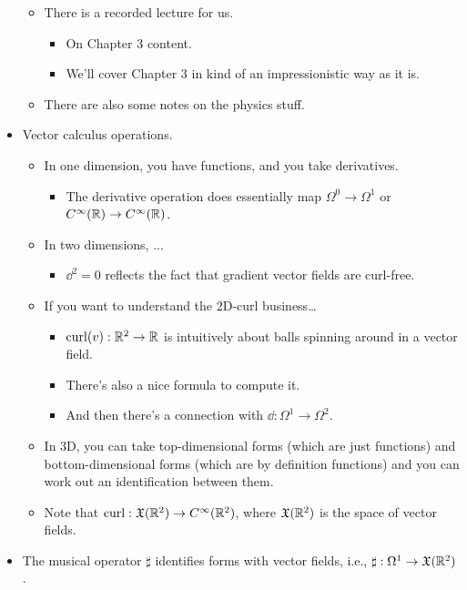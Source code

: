 \documentclass[../notes.tex]{subfiles}
\begin{document}
\begin{itemize}
\begin{itemize}
\begin{itemize}
        \end{itemize}
        \item There is a recorded lecture for us.
        \begin{itemize}
            \item On Chapter 3 content.
            \item We'll cover Chapter 3 in kind of an impressionistic way as it is.
        \end{itemize}
        \item There are also some notes on the physics stuff.
    \end{itemize}
    \item Vector calculus operations.
    \begin{itemize}
        \item In one dimension, you have functions, and you take derivatives.
        \begin{itemize}
            \item The derivative operation does essentially map $\Omega^0\to\Omega^1$ or $C^\infty(\mathbb{R})\to C^\infty(\mathbb{R})$.
        \end{itemize}
        \item In two dimensions, ...
        \begin{itemize}
            \item $\dd^2=0$ reflects the fact that gradient vector fields are curl-free.
        \end{itemize}
        \item If you want to understand the 2D-curl business\dots
        \begin{itemize}
            \item $\operatorname{curl}(v):\mathbb{R}^2\to\mathbb{R}$ is intuitively about balls spinning around in a vector field.
            \item There's also a nice formula to compute it.
            \item And then there's a connection with $\dd:\Omega^1\to\Omega^2$.
        \end{itemize}
        \item In 3D, you can take top-dimensional forms (which are just functions) and bottom-dimensional forms (which are by definition functions) and you can work out an identification between them.
        \item Note that $\operatorname{curl}:\mathfrak{X}(\mathbb{R}^2)\to C^\infty(\mathbb{R}^2)$, where $\mathfrak{X}(\mathbb{R}^2)$ is the space of vector fields.
    \end{itemize}
    \item The musical operator $\sharp$ identifies forms with vector fields, i.e., $\sharp:\Omega^1\to\mathfrak{X}(\mathbb{R}^2)$.

\end{itemize}
\end{document}
